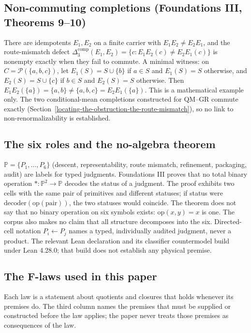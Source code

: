 \documentclass[11pt]{article}
\theoremstyle{definition}
\begin{document}
\subsection{Non-commuting completions (Foundations III, Theorems 9--10)}\label{non-commuting-completions-fiii-thms-910}

There are idempotents \(E_1,E_2\) on a finite carrier with \(E_1E_2\neq E_2E_1\), and the route-mismatch defect
\(\Delta_3^{\mathrm{comp}}(E_1,E_2)=\{c: E_1E_2(c)\neq E_2E_1(c)\}\) is nonempty exactly when they fail to commute. A
minimal witness: on \(C=\mathcal P(\{a,b,c\})\), let \(E_1(S)=S\cup\{b\}\) if \(a\in S\) and \(E_1(S)=S\) otherwise, and
\(E_2(S)=S\cup\{c\}\) if \(b\in S\) and \(E_2(S)=S\) otherwise. Then \(E_1E_2(\{a\})=\{a,b\}\neq\{a,b,c\}=E_2E_1(\{a\})\).
This is a mathematical example only. The two conditional-mean completions constructed for QM--GR commute exactly
(Section~\ref{locating-the-obstruction-the-route-mismatch}), so no link to non-renormalizability is established.

\subsection{The six roles and the no-algebra theorem}\label{the-six-primitives-and-the-no-algebra-theorem}

\(\mathbb P=\{P_1,\dots,P_6\}\) (descent, representability, route mismatch, refinement, packaging, audit) are labels for
typed judgments. Foundations III proves that no total binary operation \(*:\mathbb P^2\to\mathbb P\) decodes the status
of a judgment. The proof exhibits two cells with the same pair of primitives and different statuses; if status were
\(\mathrm{decoder}(\mathrm{op}(\text{pair}))\), the two statuses would coincide. The theorem does not say that no
binary operation on six symbols exists: \(\mathrm{op}(x,y)=x\) is one. The corpus also makes no claim that all
structure decomposes into the six. Directed-cell notation \(P_i\leftarrow P_j\) names a typed, individually audited
judgment, never a product. The relevant Lean declaration and its classifier countermodel build under Lean 4.28.0;
that build does not establish any physical premise.

\subsection{The F-laws used in this paper}\label{the-f-laws-used-in-this-paper-one-line-formal-cores}

Each law is a statement about quotients and closures that holds whenever its premises do. The third column names the
premises that must be supplied or constructed before the law applies; the paper never treats those premises as
consequences of the law.
\end{document}
